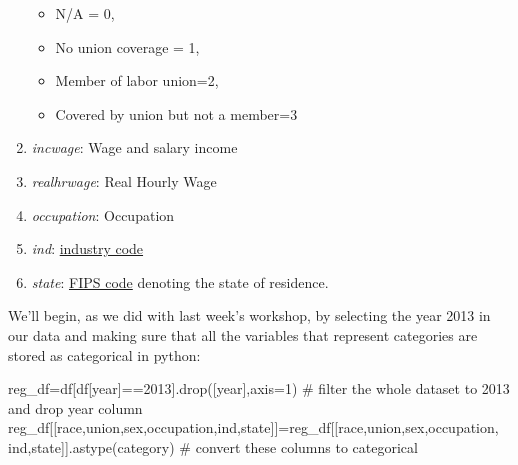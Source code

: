 \documentclass[
  letterpaper,
  DIV=11,
  numbers=noendperiod]{scrreprt}
\newenvironment{Shaded}{\begin{snugshade}}{\end{snugshade}}
\newcommand{\CommentTok}[1]{\textcolor[rgb]{0.37,0.37,0.37}{#1}}
\newcommand{\DecValTok}[1]{\textcolor[rgb]{0.68,0.00,0.00}{#1}}
\newcommand{\NormalTok}[1]{\textcolor[rgb]{0.00,0.23,0.31}{#1}}
\newcommand{\OperatorTok}[1]{\textcolor[rgb]{0.37,0.37,0.37}{#1}}
\newcommand{\StringTok}[1]{\textcolor[rgb]{0.13,0.47,0.30}{#1}}
\providecommand{\tightlist}{%
  \setlength{\itemsep}{0pt}\setlength{\parskip}{0pt}}\usepackage{longtable,booktabs,array}
\begin{document}
\begin{enumerate}
  \begin{itemize}
  \tightlist
  \item
    N/A = 0,
  \item
    No union coverage = 1,
  \item
    Member of labor union=2,
  \item
    Covered by union but not a member=3
  \end{itemize}
\item
  \emph{incwage}: Wage and salary income
\item
  \emph{realhrwage}: Real Hourly Wage
\item
  \emph{occupation}: Occupation
\item
  \emph{ind}:
  \href{https://www.census.gov/naics/?58967?yearbck=2002}{industry code}
\item
  \emph{state}:
  \href{https://www.bls.gov/respondents/mwr/electronic-data-interchange/appendix-d-usps-state-abbreviations-and-fips-codes.htm}{FIPS
  code} denoting the state of residence.
\end{enumerate}

We'll begin, as we did with last week's workshop, by selecting the year
2013 in our data and making sure that all the variables that represent
categories are stored as categorical in python:

\begin{Shaded}
\begin{Highlighting}[]
\NormalTok{reg\_df}\OperatorTok{=}\NormalTok{df[df[}\StringTok{\textquotesingle{}year\textquotesingle{}}\NormalTok{]}\OperatorTok{==}\DecValTok{2013}\NormalTok{].drop([}\StringTok{\textquotesingle{}year\textquotesingle{}}\NormalTok{],axis}\OperatorTok{=}\DecValTok{1}\NormalTok{) }\CommentTok{\# filter the whole dataset to 2013 and drop year column}
\NormalTok{reg\_df[[}\StringTok{\textquotesingle{}race\textquotesingle{}}\NormalTok{,}\StringTok{\textquotesingle{}union\textquotesingle{}}\NormalTok{,}\StringTok{\textquotesingle{}sex\textquotesingle{}}\NormalTok{,}\StringTok{\textquotesingle{}occupation\textquotesingle{}}\NormalTok{,}\StringTok{\textquotesingle{}ind\textquotesingle{}}\NormalTok{,}\StringTok{\textquotesingle{}state\textquotesingle{}}\NormalTok{]]}\OperatorTok{=}\NormalTok{reg\_df[[}\StringTok{\textquotesingle{}race\textquotesingle{}}\NormalTok{,}\StringTok{\textquotesingle{}union\textquotesingle{}}\NormalTok{,}\StringTok{\textquotesingle{}sex\textquotesingle{}}\NormalTok{,}\StringTok{\textquotesingle{}occupation\textquotesingle{}}\NormalTok{, }\StringTok{\textquotesingle{}ind\textquotesingle{}}\NormalTok{,}\StringTok{\textquotesingle{}state\textquotesingle{}}\NormalTok{]].astype(}\StringTok{\textquotesingle{}category\textquotesingle{}}\NormalTok{) }\CommentTok{\# convert these columns to categorical}
\end{Highlighting}
\end{Shaded}
\end{document}
